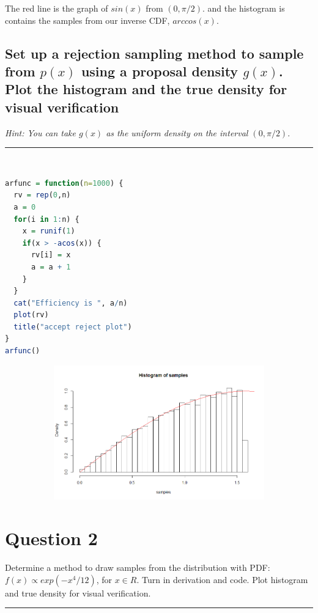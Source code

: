 \documentclass[20pt]{article} %
\begin{document}
The red line is the graph of $sin(x)$ from $(0, \pi/2)$. and the histogram is contains the samples from our inverse CDF, $arccos(x)$.

\subsection{Set up a rejection sampling method to sample from $p(x)$ using a proposal density $g(x)$. Plot the histogram and the true density for visual verification}
\textit{Hint: You can take $g(x)$ as the uniform density on the interval $(0,\pi / 2)$}. \\ \noindent\rule{2cm}{0.4pt} \\

\begin{lstlisting}[language=R]
arfunc = function(n=1000) {
  rv = rep(0,n)
  a = 0
  for(i in 1:n) {
    x = runif(1)
    if(x > -acos(x)) {
      rv[i] = x
      a = a + 1
    }
  }
  cat("Efficiency is ", a/n)  
  plot(rv)
  title("accept reject plot")
}
arfunc()
\end{lstlisting}

\begin{figure}[!htbp]
  	\centering
   	\begin{subfigure}[p]{0.8\linewidth}
    	\includegraphics[width=\linewidth]{./figures/Rplot01.png}
   	\end{subfigure}
\end{figure} 

\section{Question 2}
Determine a method to draw samples from the distribution with PDF: $f(x) \propto exp(-x^{4} / 12)$, for $x \in \!R$.  Turn in derivation and code. Plot histogram and true density for visual verification. \\ \noindent\rule{2cm}{0.4pt} \\
\end{document}
